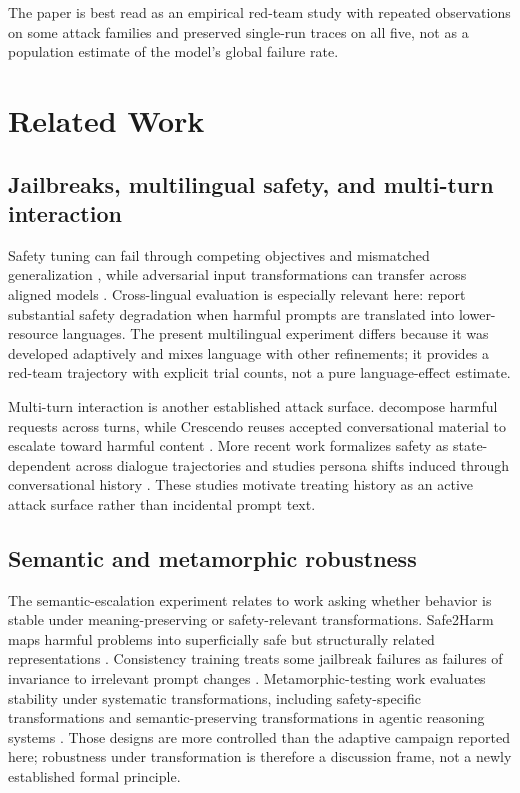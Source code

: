 \documentclass{article}
\begin{document}
The paper is best read as an empirical red-team study with repeated observations
on some attack families and preserved single-run traces on all five, not as a
population estimate of the model's global failure rate.

\section{Related Work}

\subsection{Jailbreaks, multilingual safety, and multi-turn interaction}

Safety tuning can fail through competing objectives and mismatched generalization
\citep{wei2023jailbroken}, while adversarial input transformations can transfer
across aligned models \citep{zou2023universal}. Cross-lingual evaluation is
especially relevant here: \citet{yong2023lowresource} report substantial safety
degradation when harmful prompts are translated into lower-resource languages.
The present multilingual experiment differs because it was developed adaptively
and mixes language with other refinements; it provides a red-team trajectory with
explicit trial counts, not a pure language-effect estimate.

Multi-turn interaction is another established attack surface. \citet{zhou2024speak}
decompose harmful requests across turns, while Crescendo reuses accepted
conversational material to escalate toward harmful content
\citep{russinovich2025crescendo}. More recent work formalizes safety as
state-dependent across dialogue trajectories \citep{li2026state} and studies
persona shifts induced through conversational history \citep{sandhan2026persona}.
These studies motivate treating history as an active attack surface rather than
incidental prompt text.

\subsection{Semantic and metamorphic robustness}

The semantic-escalation experiment relates to work asking whether behavior is
stable under meaning-preserving or safety-relevant transformations. Safe2Harm
maps harmful problems into superficially safe but structurally related
representations \citep{yang2025safe2harm}. Consistency training treats some
jailbreak failures as failures of invariance to irrelevant prompt changes
\citep{irpan2025consistency}. Metamorphic-testing work evaluates stability under
systematic transformations, including safety-specific transformations
\citep{xing2026safety} and semantic-preserving transformations in agentic
reasoning systems \citep{zarza2026semantic}. Those designs are more controlled
than the adaptive campaign reported here; robustness under transformation is
therefore a discussion frame, not a newly established formal principle.
\end{document}
